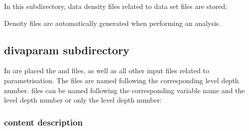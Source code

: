 In this subdirectory, data density files related to data set files are stored:

\begin{center}
\end{center}


\btips
Density files are automatically generated when performing an analysis.
\etips

\subsection{divaparam subdirectory}

In  are placed the  and  files, as well as all other input files related to \diva parametrisation. The  files are named following the corresponding level depth number.  files can be named following the  corresponding variable name and the level depth number or only the level depth number:


\begin{center}
\end{center}


\subsubsection{ content description}


